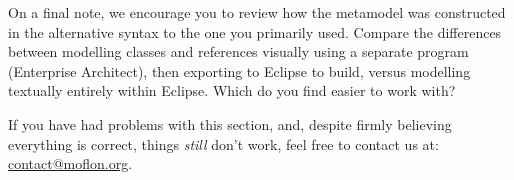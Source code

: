 On a final note, we encourage you to review how the metamodel was constructed in the alternative syntax to the one you primarily used. Compare the
differences between modelling classes and references visually using a separate program (Enterprise Architect), then exporting to Eclipse to build, versus
modelling textually entirely within Eclipse. Which do you find easier to work with?

If you have had problems with this section, and, despite firmly believing everything is correct, things \emph{still} don't work, feel free to contact us at:\\ 
\href{mailto:contact@moflon.org}{contact@moflon.org}.

